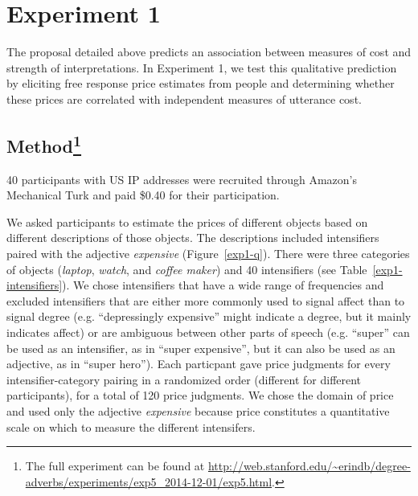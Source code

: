\documentclass[10pt,letterpaper]{article}
\newcommand{\w}[1]{\emph{#1}}
\newcommand{\todo}[1]{{\color{red}#1}}
\begin{document}
\section{Experiment 1}

The proposal detailed above predicts an association between measures of cost and strength of interpretations. In Experiment 1, we test this qualitative prediction %
by eliciting free response price estimates from people and determining whether these prices are correlated with independent measures of utterance cost.

\subsection{Method\footnote{The full experiment can be found at \url{http://web.stanford.edu/~erindb/degree-adverbs/experiments/exp5_2014-12-01/exp5.html}.}}

40 participants with US IP addresses were recruited through Amazon's Mechanical Turk and paid \$0.40 for their participation.

We asked participants to estimate the prices of different objects based on different descriptions of those objects. The descriptions included intensifiers paired with the adjective \w{expensive} (Figure~\ref{exp1-q}).
There were three categories of objects (\emph{laptop}, \emph{watch}, and \emph{coffee maker}) and 40 intensifiers (see Table~\ref{exp1-intensifiers}).
We chose intensifiers that have a wide range of frequencies and excluded intensifiers that are either more commonly used to signal affect than to signal degree (e.g. ``depressingly expensive'' might indicate a degree, but it mainly indicates affect) or are ambiguous between other parts of speech (e.g. ``super'' can be used as an intensifier, as in ``super expensive'', but it can also be used as an adjective, as in ``super hero'').
Each particpant gave price judgments for every intensifier-category pairing in a randomized order (different for different participants), for a total of 120 price judgments.
We chose the domain of price and used only the adjective \w{expensive} because price constitutes a quantitative scale on which to measure the different intensifers.%
\end{document}

